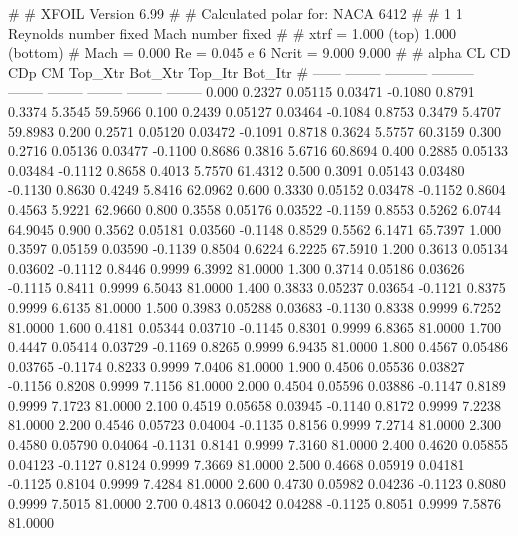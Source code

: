 #  
#       XFOIL         Version 6.99
#  
# Calculated polar for: NACA 6412                                       
#  
# 1 1 Reynolds number fixed          Mach number fixed         
#  
# xtrf =   1.000 (top)        1.000 (bottom)  
# Mach =   0.000     Re =     0.045 e 6     Ncrit =   9.000  9.000
#  
#   alpha    CL        CD       CDp       CM     Top_Xtr  Bot_Xtr  Top_Itr  Bot_Itr
#  ------ -------- --------- --------- -------- -------- -------- -------- --------
   0.000   0.2327   0.05115   0.03471  -0.1080   0.8791   0.3374   5.3545  59.5966
   0.100   0.2439   0.05127   0.03464  -0.1084   0.8753   0.3479   5.4707  59.8983
   0.200   0.2571   0.05120   0.03472  -0.1091   0.8718   0.3624   5.5757  60.3159
   0.300   0.2716   0.05136   0.03477  -0.1100   0.8686   0.3816   5.6716  60.8694
   0.400   0.2885   0.05133   0.03484  -0.1112   0.8658   0.4013   5.7570  61.4312
   0.500   0.3091   0.05143   0.03480  -0.1130   0.8630   0.4249   5.8416  62.0962
   0.600   0.3330   0.05152   0.03478  -0.1152   0.8604   0.4563   5.9221  62.9660
   0.800   0.3558   0.05176   0.03522  -0.1159   0.8553   0.5262   6.0744  64.9045
   0.900   0.3562   0.05181   0.03560  -0.1148   0.8529   0.5562   6.1471  65.7397
   1.000   0.3597   0.05159   0.03590  -0.1139   0.8504   0.6224   6.2225  67.5910
   1.200   0.3613   0.05134   0.03602  -0.1112   0.8446   0.9999   6.3992  81.0000
   1.300   0.3714   0.05186   0.03626  -0.1115   0.8411   0.9999   6.5043  81.0000
   1.400   0.3833   0.05237   0.03654  -0.1121   0.8375   0.9999   6.6135  81.0000
   1.500   0.3983   0.05288   0.03683  -0.1130   0.8338   0.9999   6.7252  81.0000
   1.600   0.4181   0.05344   0.03710  -0.1145   0.8301   0.9999   6.8365  81.0000
   1.700   0.4447   0.05414   0.03729  -0.1169   0.8265   0.9999   6.9435  81.0000
   1.800   0.4567   0.05486   0.03765  -0.1174   0.8233   0.9999   7.0406  81.0000
   1.900   0.4506   0.05536   0.03827  -0.1156   0.8208   0.9999   7.1156  81.0000
   2.000   0.4504   0.05596   0.03886  -0.1147   0.8189   0.9999   7.1723  81.0000
   2.100   0.4519   0.05658   0.03945  -0.1140   0.8172   0.9999   7.2238  81.0000
   2.200   0.4546   0.05723   0.04004  -0.1135   0.8156   0.9999   7.2714  81.0000
   2.300   0.4580   0.05790   0.04064  -0.1131   0.8141   0.9999   7.3160  81.0000
   2.400   0.4620   0.05855   0.04123  -0.1127   0.8124   0.9999   7.3669  81.0000
   2.500   0.4668   0.05919   0.04181  -0.1125   0.8104   0.9999   7.4284  81.0000
   2.600   0.4730   0.05982   0.04236  -0.1123   0.8080   0.9999   7.5015  81.0000
   2.700   0.4813   0.06042   0.04288  -0.1125   0.8051   0.9999   7.5876  81.0000
